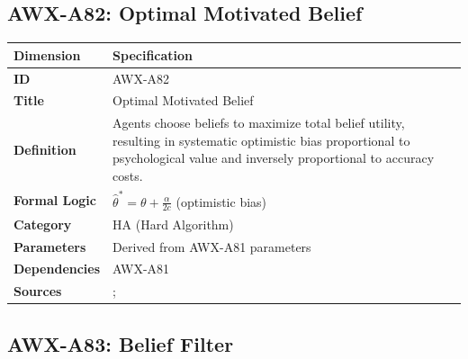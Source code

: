 
\subsection{AWX-A82: Optimal Motivated Belief}

\begin{table}[htbp]
\small
\begin{tabular}{p{3cm}p{11cm}}
\toprule
\textbf{Dimension} & \textbf{Specification} \\
\midrule
\textbf{ID} & AWX-A82 \\
\textbf{Title} & Optimal Motivated Belief \\
\textbf{Definition} & Agents choose beliefs to maximize total belief utility, resulting in systematic optimistic bias proportional to psychological value and inversely proportional to accuracy costs. \\
\textbf{Formal Logic} & $\hat{\theta}^* = \theta + \frac{\alpha}{2c}$ (optimistic bias) \\
\textbf{Category} & HA (Hard Algorithm) \\
\textbf{Parameters} & Derived from AWX-A81 parameters \\
\textbf{Dependencies} & AWX-A81 \\
\textbf{Sources} & \citet{benabou2015economics}; \citet{benabou2002self} \\
\bottomrule
\end{tabular}
\end{table}


\subsection{AWX-A83: Belief Filter}

